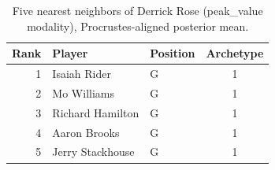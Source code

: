\begin{table}[htbp]
  \centering\small
  \begin{tabular}{rllc}
    \toprule
    Rank & Player & Position & Archetype \\
    \midrule
    1 & Isaiah Rider & G & 1 \\
    2 & Mo Williams & G & 1 \\
    3 & Richard Hamilton & G & 1 \\
    4 & Aaron Brooks & G & 1 \\
    5 & Jerry Stackhouse & G & 1 \\
    \bottomrule
  \end{tabular}
  \caption{Five nearest neighbors of Derrick Rose (peak_value modality), Procrustes-aligned posterior mean.}
  \label{tab:Derrick_Rose_neighbors_peak_value}
\end{table}

